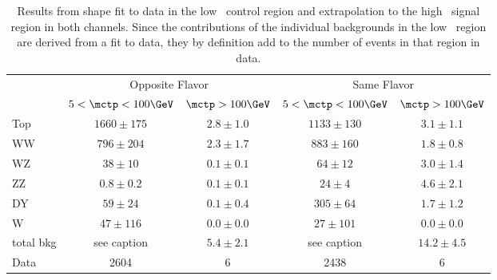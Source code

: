 \begin{table}
    \begin{center}
    \caption{Results from shape fit to data in the low \mctp\ control region and extrapolation to the high \mctp\ signal region in both channels. Since the contributions of the individual backgrounds in the low \mctp\ region are derived from a fit to data, they by definition add to the number of events in that region in data.}
    \label{tab:fit}
    \begin{tabular}{l|c|c|c|c}
    \hline\hline
        & \multicolumn{2}{c|}{Opposite Flavor} & \multicolumn{2}{c}{Same Flavor}\\
         & $5 < \mctp < 100 \GeV$ & $\mctp > 100 \GeV$ & $5 < \mctp < 100 \GeV$ & $\mctp > 100 \GeV$\\
         \hline
Top & $1660\pm175$ & $2.8\pm1.0$& $1133\pm130$& $3.1\pm1.1$\\
WW &  $796\pm204$ & $2.3\pm1.7$& $883\pm160$& $1.8\pm0.8$\\
WZ &  $38\pm10$ & $0.1\pm0.1$& $64\pm12$& $3.0\pm1.4$\\
ZZ &  $0.8\pm0.2$ & $0.1\pm0.1$& $24\pm4$& $4.6\pm2.1$\\
DY &  $59\pm24$ & $0.1\pm0.4$& $305\pm64$& $1.7\pm1.2$\\
W &   $47\pm116$ & $0.0\pm0.0$& $27\pm101$& $0.0\pm0.0$\\
\hline
total bkg & see caption & $5.4\pm2.1$ & see caption & $14.2\pm4.5$\\
Data & 2604 & 6 & 2438 & 6\\
    \end{tabular}
    \end{center}
\end{table}

